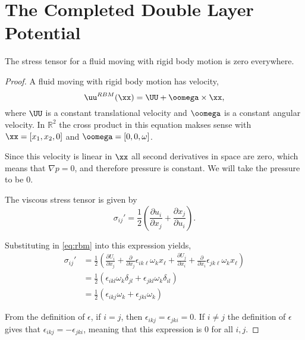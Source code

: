 \chapter{The Completed Double Layer Potential}

\begin{proposition}
The stress tensor for a fluid moving with rigid body motion is zero everywhere.
\end{proposition}

\begin{proof}
	A fluid moving with rigid body motion has velocity,
	\begin{equation}\label{eq:rbm} \uu^{RBM}(\xx) = \UU + \oomega\times\xx,\end{equation}
	where $\UU$ is a constant translational velocity and $\oomega$ is a constant angular velocity. In $\mathbb{R}^2$ the cross product in this equation makses sense with $\xx = [x_1, x_2, 0]$ and $\oomega = [0, 0, \omega]$. 

Since this velocity is linear in $\xx$ all second derivatives in space are zero, which means that $\nabla p = 0$, and therefore pressure is constant. We will take the pressure to be 0. 

	The viscous stress tensor is given by
	\[ \sigma_{ij}' = \frac{1}{2}\left(\frac{\partial u_i}{\partial x_j} + \frac{\partial x_j}{\partial u_i}\right).\]
	
	Substituting in \eqref{eq:rbm} into this expression yields,
	\begin{align*}
		\sigma_{ij}' &= \frac{1}{2}\left(\frac{\partial U_i}{\partial x_j} + \frac{\partial}{\partial x_j}\epsilon_{i k \ell} \omega_k x_{\ell} + 
					\frac{\partial U_j}{\partial x_i} + \frac{\partial}{\partial x_i}\epsilon_{j k \ell} \omega_k x_{\ell} \right)\\
			     &= \frac{1}{2}\left(\epsilon_{ikl}\omega_k\delta_{jl} + \epsilon_{jkl}\omega_k\delta_{il}\right)\\
			    &= \frac{1}{2}\left(\epsilon_{ikj}\omega_k + \epsilon_{jki}\omega_k\right)
	\end{align*}

	From the definition of $\epsilon$, if $i=j$, then $\epsilon_{ikj} =\epsilon_{jki} = 0$. If $i\ne j$ the definition of $\epsilon$ gives that $\epsilon_{ikj} = -\epsilon_{jki}$, meaning that this expression is 0 for all $i,j$. 

\end{proof}